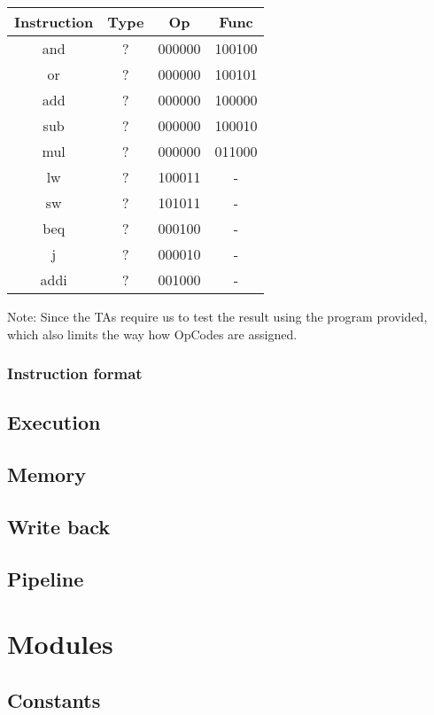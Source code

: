 \documentclass[11pt, a4paper, twoside]{IEEEtran}
\begin{document}
\begin{table}[h]
	\centering
	\begin{tabular}{|c|ccc|}
	\hline
    Instruction & Type & Op & Func\\
    \hline
    and & ? & 000000 & 100100 \\
    or & ? & 000000 & 100101 \\
    add & ? & 000000 & 100000 \\
    sub & ? & 000000 & 100010 \\
    mul & ? & 000000 & 011000 \\
    lw & ? & 100011 & - \\
    sw & ? & 101011 & - \\
    beq & ? & 000100 & - \\
    j & ? & 000010 & - \\
    addi & ? & 001000 & - \\
    \hline
	\end{tabular}
\end{table}

Note: Since the TAs require us to test the result using the program provided, which also limits the way how OpCodes are assigned.\\

\subsubsection{Instruction format}

\subsection{Execution}
\subsection{Memory}
\subsection{Write back}
\subsection{Pipeline}
	
\section{Modules}
	\subsection{Constants}
\end{document}
